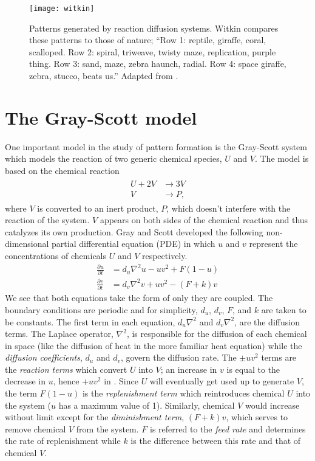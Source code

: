 \begin{figure}[h]
	\centering
	\texttt{[image: witkin]}
         \caption{Patterns generated by reaction diffusion systems. Witkin compares these patterns to those of nature; ``Row 1: reptile, giraffe, coral, scalloped. Row 2: spiral, triweave, twisty maze, replication, purple thing. Row 3: sand, maze, zebra haunch, radial. Row 4: space giraffe, zebra, stucco, beats us.'' Adapted from \protect{}.} \label{fig:witkin}
\end{figure}
	
\section{The Gray-Scott model} \label{sect:gsmodel}
	One important model in the study of pattern formation is the Gray-Scott system which models the reaction of two generic chemical species, $U$ and $V$. The model is based on the chemical reaction
	\begin{align}
	\begin{split}
		U + 2V &\rightarrow 3V \\
		V &\rightarrow P,
		\label{eq:gs-chem}
	\end{split}
	\end{align}
where $V$ is converted to an inert product, $P$, which doesn't interfere with the reaction of the system. $V$ appears on both sides of the chemical reaction and thus catalyzes its own production. Gray and Scott developed the following non-dimensional partial differential equation (PDE) in which $u$ and $v$ represent the concentrations of chemicals $U$ and $V$ respectively.
	\begin{align}
		\frac{\partial u}{\partial t} & = d_u \nabla^2 u - uv^2 + F(1-u) \label{eq:gsu} \\
		\frac{\partial v}{\partial t} & = d_v \nabla^2 v  + uv^2 - (F +k)v \label{eq:gsv}
	\end{align}
We see that both equations take the form of  only they are coupled. The boundary conditions are periodic and for simplicity, $d_u$, $d_v$, $F$, and $k$ are taken to be constants. The first term in each equation, $d_u \nabla^2$ and $d_v \nabla^2$, are the diffusion terms. The Laplace operator, $\nabla^2$, is responsible for the diffusion of each chemical in space (like the diffusion of heat in the more familiar heat equation) while the \textit{diffusion coefficients}, $d_u$ and $d_v$, govern the diffusion rate. The $\pm uv^2$ terms are the  \textit{reaction terms} which convert $U$ into $V$; an increase in $v$ is equal to the decrease in $u$, hence $+uv^2$ in . Since $U$ will eventually get used up to generate $V$, the term $F(1-u)$ is the \textit{replenishment term} which reintroduces chemical $U$ into the system ($u$ has a maximum value of 1). Similarly, chemical $V$ would increase without limit except for the \textit{diminishment term}, $(F+k)v$, which serves to remove chemical $V$ from the system. $F$ is referred to the \textit{feed rate} and determines the rate of replenishment while $k$ is the difference between this rate and that of chemical $V$.

